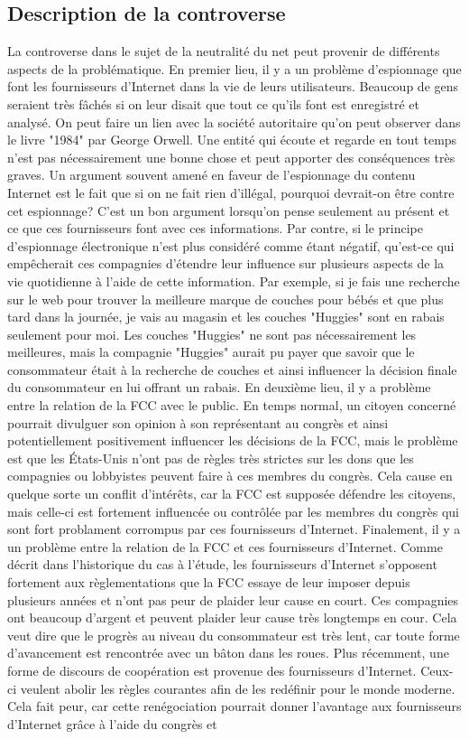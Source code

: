 \documentclass[12pt]{article}
\begin{document}
\subsection{Description de la controverse}
La controverse dans le sujet de la neutralité du net peut provenir de différents aspects de la problématique. En premier lieu, il y a un problème d’espionnage que font les fournisseurs d’Internet dans la vie de leurs utilisateurs. Beaucoup de gens seraient très fâchés si on leur disait que tout ce qu’ils font est enregistré et analysé. On peut faire un lien avec la société autoritaire qu’on peut observer dans le livre "1984" par George Orwell. Une entité qui écoute et regarde en tout temps n’est pas nécessairement une bonne chose et peut apporter des conséquences très graves. Un argument souvent amené en faveur de l’espionnage du contenu Internet est le fait que si on ne fait rien d’illégal, pourquoi devrait-on être contre cet espionnage? C’est un bon argument lorsqu’on pense seulement au présent et ce que ces fournisseurs font avec ces informations. Par contre, si le principe d’espionnage électronique n’est plus considéré comme étant négatif, qu’est-ce qui empêcherait ces compagnies d’étendre leur influence sur plusieurs aspects de la vie quotidienne à l’aide de cette information. Par exemple, si je fais une recherche sur le web pour trouver la meilleure marque de couches pour bébés et que plus tard dans la journée, je vais au magasin et les couches "Huggies" sont en rabais seulement pour moi. Les couches "Huggies" ne sont pas nécessairement les meilleures, mais la compagnie "Huggies" aurait pu payer que savoir que le consommateur était à la recherche de couches et ainsi influencer la décision finale du consommateur en lui offrant un rabais. En deuxième lieu, il y a problème entre la relation de la FCC avec le public. En temps normal, un citoyen concerné pourrait divulguer son opinion à son représentant au congrès et ainsi potentiellement positivement influencer les décisions de la FCC, mais le problème est que les États-Unis n’ont pas de règles très strictes sur les dons que les compagnies ou lobbyistes peuvent faire à ces membres du congrès. Cela cause en quelque sorte un conflit d’intérêts, car la FCC est supposée défendre les citoyens, mais celle-ci est fortement influencée ou contrôlée par les membres du congrès qui sont fort problament corrompus par ces fournisseurs d’Internet. Finalement, il y a un problème entre la relation de la FCC et ces fournisseurs d’Internet. Comme décrit dans l’historique du cas à l’étude, les fournisseurs d’Internet s’opposent fortement aux règlementations que la FCC essaye de leur imposer depuis plusieurs années et n’ont pas peur de plaider leur cause en court. Ces compagnies ont beaucoup d’argent et peuvent plaider leur cause très longtemps en cour. Cela veut dire que le progrès au niveau du consommateur est très lent, car toute forme d’avancement est rencontrée avec un bâton dans les roues. Plus récemment, une forme de discours de coopération est provenue des fournisseurs d’Internet. Ceux-ci veulent abolir les règles courantes afin de les redéfinir pour le monde moderne. Cela fait peur, car cette renégociation pourrait donner l’avantage aux fournisseurs d’Internet grâce à l’aide du congrès et 
\end{document}
